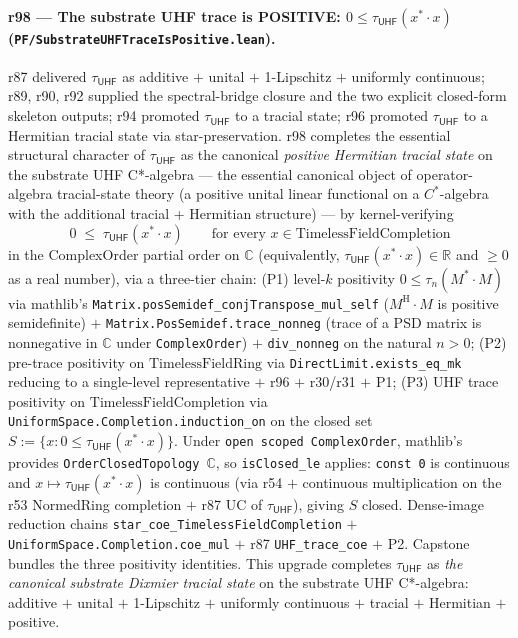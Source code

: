 \documentclass[11pt,a4paper]{amsart}
\theoremstyle{plain}
\theoremstyle{definition}
\begin{document}
\paragraph{r98 --- The substrate UHF trace is POSITIVE: $0 \le \tau_{\textsf{UHF}}(x^* \cdot x)$ (\texttt{PF/SubstrateUHFTraceIsPositive.lean}).} r87 delivered $\tau_{\textsf{UHF}}$ as additive $+$ unital $+$ 1-Lipschitz $+$ uniformly continuous; r89, r90, r92 supplied the spectral-bridge closure and the two explicit closed-form skeleton outputs; r94 promoted $\tau_{\textsf{UHF}}$ to a tracial state; r96 promoted $\tau_{\textsf{UHF}}$ to a Hermitian tracial state via star-preservation. r98 completes the essential structural character of $\tau_{\textsf{UHF}}$ as the canonical \emph{positive Hermitian tracial state} on the substrate UHF C*-algebra --- the essential canonical object of operator-algebra tracial-state theory (a positive unital linear functional on a $C^*$-algebra with the additional tracial + Hermitian structure) --- by kernel-verifying
\[
\boxed{\; 0 \;\le\; \tau_{\textsf{UHF}}(x^* \cdot x) \qquad \text{for every } x \in \mathrm{TimelessFieldCompletion} \;}
\]
in the ComplexOrder partial order on $\mathbb{C}$ (equivalently, $\tau_{\textsf{UHF}}(x^* \cdot x) \in \mathbb{R}$ and $\ge 0$ as a real number), via a three-tier chain: (P1) level-$k$ positivity  $0 \le \tau_n(M^* \cdot M)$ via mathlib's \texttt{Matrix.posSemidef\_conjTranspose\_mul\_self} ($M^\mathrm{H} \cdot M$ is positive semidefinite) $+$ \texttt{Matrix.PosSemidef.trace\_nonneg} (trace of a PSD matrix is nonnegative in $\mathbb{C}$ under \texttt{ComplexOrder}) $+$ \texttt{div\_nonneg} on the natural $n > 0$; (P2) pre-trace positivity on $\mathrm{TimelessFieldRing}$  via \texttt{DirectLimit.exists\_eq\_mk} reducing to a single-level representative $+$ r96  $+$ r30/r31  $+$ P1; (P3) UHF trace positivity on $\mathrm{TimelessFieldCompletion}$  via \texttt{UniformSpace.Completion.induction\_on} on the closed set $S := \{ x : 0 \le \tau_{\textsf{UHF}}(x^* \cdot x) \}$. Under \texttt{open scoped ComplexOrder}, mathlib's  provides \texttt{OrderClosedTopology}~$\mathbb{C}$, so \texttt{isClosed\_le} applies: \texttt{const 0} is continuous and $x \mapsto \tau_{\textsf{UHF}}(x^* \cdot x)$ is continuous (via r54  $+$ continuous multiplication on the r53 NormedRing completion $+$ r87 UC of $\tau_{\textsf{UHF}}$), giving $S$ closed. Dense-image reduction chains \texttt{star\_coe\_TimelessFieldCompletion} $+$ \texttt{UniformSpace.Completion.coe\_mul} $+$ r87 \texttt{UHF\_trace\_coe} $+$ P2. Capstone  bundles the three positivity identities. This upgrade completes $\tau_{\textsf{UHF}}$ as \emph{the canonical substrate Dixmier tracial state} on the substrate UHF C*-algebra: additive $+$ unital $+$ 1-Lipschitz $+$ uniformly continuous $+$ tracial $+$ Hermitian $+$ positive.
\end{document}
